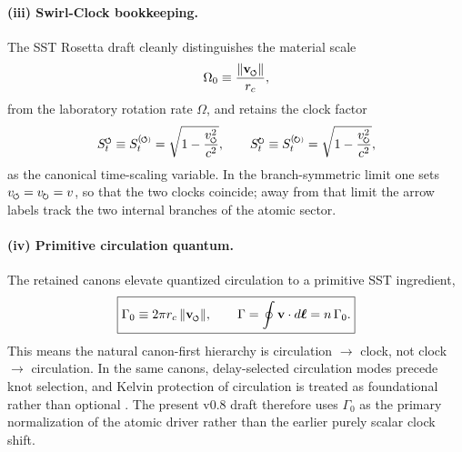 \documentclass[11pt,a4paper]{article}
\newcommand{\swirlarrow}{\mathchoice{\mkern-2mu\scriptstyle\boldsymbol{\circlearrowleft}}{\mkern-2mu\scriptstyle\boldsymbol{\circlearrowleft}}{\mkern-2mu\scriptscriptstyle\boldsymbol{\circlearrowleft}}{\mkern-2mu\scriptscriptstyle\boldsymbol{\circlearrowleft}}}
\newcommand{\swirlarrowcw}{\mathchoice{\mkern-2mu\scriptstyle\boldsymbol{\circlearrowright}}{\mkern-2mu\scriptstyle\boldsymbol{\circlearrowright}}{\mkern-2mu\scriptscriptstyle\boldsymbol{\circlearrowright}}{\mkern-2mu\scriptscriptstyle\boldsymbol{\circlearrowright}}}
\newcommand{\vswirl}{\mathbf{v}_{\swirlarrow}}
\newcommand{\SwirlClock}{S_t^{\swirlarrow}}
\newcommand{\SwirlClockcw}{S_t^{\swirlarrowcw}}
\newcommand{\rc}{r_c}
\begin{document}
\paragraph{(iii) Swirl-Clock bookkeeping.} The SST Rosetta draft cleanly distinguishes the material scale
\begin{equation}
\label{eq:Omega0}
\Omega_0 \equiv \frac{\lVert \vswirl\rVert}{\rc},
\end{equation}
from the laboratory rotation rate $\Omega$, and retains the clock factor
\begin{equation}
\label{eq:SwirlClock}
\SwirlClock \equiv S_t^{(\swirlarrow)} = \sqrt{1-\frac{v_{\swirlarrow}^{2}}{c^2}},
\qquad
\SwirlClockcw \equiv S_t^{(\swirlarrowcw)} = \sqrt{1-\frac{v_{\swirlarrowcw}^{2}}{c^2}},
\end{equation}
as the canonical time-scaling variable. In the branch-symmetric limit one sets $v_{\swirlarrow}=v_{\swirlarrowcw}=v$, so that the two clocks coincide; away from that limit the arrow labels track the two internal branches of the atomic sector.

\paragraph{(iv) Primitive circulation quantum.} The retained canons elevate quantized circulation to a primitive SST ingredient,
\begin{equation}
\label{eq:Gamma0}
\boxed{
\Gamma_0 \equiv 2\pi \rc\,\lVert \vswirl\rVert,
\qquad
\Gamma = \oint \mathbf v\cdot d\boldsymbol\ell = n\,\Gamma_0.
}
\end{equation}
This means the natural canon-first hierarchy is circulation $\to$ clock, not clock $\to$ circulation. In the same canons, delay-selected circulation modes precede knot selection, and Kelvin protection of circulation is treated as foundational rather than optional \cite{IskandaraniCanon078,IskandaraniCanon060}. The present v0.8 draft therefore uses $\Gamma_0$ as the primary normalization of the atomic driver rather than the earlier purely scalar clock shift.
\end{document}
